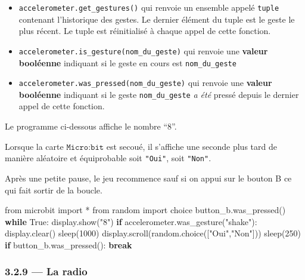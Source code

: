 \documentclass[a4paper,17pt]{extarticle}
\providecommand{\tightlist}{%
      \setlength{\itemsep}{0pt}\setlength{\parskip}{0pt}}
\newenvironment{Shaded}{}{}
\newcommand{\DecValTok}[1]{\textcolor[rgb]{0.25,0.63,0.44}{{#1}}}
\newcommand{\StringTok}[1]{\textcolor[rgb]{0.25,0.44,0.63}{{#1}}}
\newcommand{\NormalTok}[1]{{#1}}
\newcommand{\ImportTok}[1]{{#1}}
\newcommand{\VariableTok}[1]{\textcolor[rgb]{0.10,0.09,0.49}{{#1}}}
\newcommand{\ControlFlowTok}[1]{\textcolor[rgb]{0.00,0.44,0.13}{\textbf{{#1}}}}
\newcommand{\OperatorTok}[1]{\textcolor[rgb]{0.40,0.40,0.40}{{#1}}}
\begin{document}
\begin{itemize}
\tightlist
\item
  \texttt{accelerometer.get\_gestures()} qui renvoie un ensemble appelé
  \texttt{tuple} contenant l'historique des gestes. Le dernier élément
  du tuple est le geste le plus récent. Le tuple est réinitialisé à
  chaque appel de cette fonction.
\item
  \texttt{accelerometer.is\_gesture(nom\_du\_geste)} qui renvoie une
  \textbf{valeur booléenne} indiquant si le geste en cours est
  \texttt{nom\_du\_geste}
\item
  \texttt{accelerometer.was\_pressed(nom\_du\_geste)} qui renvoie une
  \textbf{valeur booléenne} indiquant si le geste
  \texttt{nom\_du\_geste} \emph{a été} pressé depuis le dernier appel de
  cette fonction.
\end{itemize}
\begin{exemple}
    Le programme ci-dessous affiche le nombre ``8''.

Lorsque la carte \(\texttt{Micro:bit}\) est secoué, il s'affiche une
seconde plus tard de manière aléatoire et équiprobable soit
\texttt{"Oui"}, soit \texttt{"Non"}.

Après une petite pause, le jeu recommence sauf si on appui sur le bouton
B ce qui fait sortir de la boucle.

\begin{Shaded}
\begin{Highlighting}[]
\ImportTok{from}\NormalTok{ microbit }\ImportTok{import} \OperatorTok{*}
\ImportTok{from}\NormalTok{ random }\ImportTok{import}\NormalTok{ choice}
\NormalTok{button\_b.was\_pressed()}
\ControlFlowTok{while} \VariableTok{True}\NormalTok{:}
\NormalTok{    display.show(}\StringTok{"8"}\NormalTok{)}
    \ControlFlowTok{if}\NormalTok{ accelerometer.was\_gesture(}\StringTok{"shake"}\NormalTok{):}
\NormalTok{        display.clear()}
\NormalTok{        sleep(}\DecValTok{1000}\NormalTok{)}
\NormalTok{        display.scroll(random.choice([}\StringTok{"Oui"}\NormalTok{,}\StringTok{"Non"}\NormalTok{]))}
\NormalTok{        sleep(}\DecValTok{250}\NormalTok{)}
    \ControlFlowTok{if}\NormalTok{ button\_b.was\_pressed():}
        \ControlFlowTok{break}
\end{Highlighting}
\end{Shaded}

        \end{exemple}
    \hypertarget{la-radio}{%
\subsubsection{3.2.9 --- La radio}\label{la-radio}}
\end{document}
